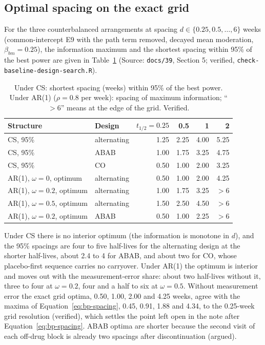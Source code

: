 \documentclass[11pt]{article}
\newcommand{\code}[1]{\texttt{#1}}
\begin{document}
\subsection{Optimal spacing on the exact grid}
\label{sec:invf-spacing}

For the three counterbalanced arrangements at spacing $d \in \{0.25,
0.5, \dots, 6\}$ weeks (common-intercept E9 with the path term removed,
decayed mean moderation, $\beta_{bm} = 0.25$), the information maximum and
the shortest spacing within 95\% of the best power are given in
Table~\ref{tab:invf-spacing} (Source: \code{docs/39}, Section 5;
verified, \code{check-baseline-design-search.R}).

\begin{table}[h]
\centering\small
\caption{Under CS: shortest spacing (weeks) within 95\% of the best
power. Under AR(1) ($\rho = 0.8$ per week): spacing of maximum
information; ``$>6$'' means at the edge of the grid. Verified.}
\label{tab:invf-spacing}
\begin{tabular}{@{}llrrrr@{}}
\toprule
Structure & Design & $t_{1/2} = 0.25$ & 0.5 & 1 & 2 \\
\midrule
CS, 95\% & alternating & 1.25 & 2.25 & 4.00 & 5.25 \\
CS, 95\% & ABAB & 1.00 & 1.75 & 3.25 & 4.75 \\
CS, 95\% & CO & 0.50 & 1.00 & 2.00 & 3.25 \\
AR(1), $\omega = 0$, optimum & alternating & 0.50 & 1.00 & 2.00 & 4.25 \\
AR(1), $\omega = 0.2$, optimum & alternating & 1.00 & 1.75 & 3.25 & $>6$ \\
AR(1), $\omega = 0.5$, optimum & alternating & 1.50 & 2.50 & 4.50 & $>6$ \\
AR(1), $\omega = 0.2$, optimum & ABAB & 0.50 & 1.00 & 2.25 & $>6$ \\
\bottomrule
\end{tabular}
\end{table}

\noindent Under CS there is no interior optimum (the information is
monotone in $d$), and the 95\% spacings are four to five half-lives for
the alternating design at the shorter half-lives, about 2.4 to 4 for
ABAB, and about two for CO, whose placebo-first sequence carries no
carryover. Under AR(1) the optimum is interior and moves out with the
measurement-error share: about two half-lives without it, three to four
at $\omega = 0.2$, four and a half to six at $\omega = 0.5$. Without
measurement error the exact grid optima, 0.50, 1.00, 2.00 and 4.25 weeks,
agree with the maxima of Equation~\eqref{eq:bp-spacing}, 0.45, 0.91, 1.88
and 4.34, to the 0.25-week grid resolution (verified), which settles the
point left open in the note after Equation~\eqref{eq:bp-spacing}. ABAB
optima are shorter because the second visit of each off-drug block is
already two spacings after discontinuation (argued).
\end{document}
